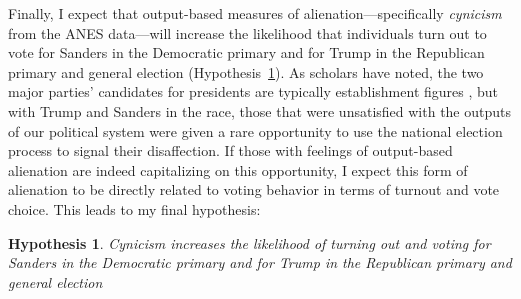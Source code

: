 \documentclass[12pt]{article}
\newtheorem{hyp}{Hypothesis}
\begin{document}
 

Finally, I expect that output-based measures of alienation---specifically \textit{cynicism} from the ANES data---will increase the likelihood that individuals turn out to vote for Sanders in the Democratic primary and for Trump in the Republican primary and general election (Hypothesis~\ref{hyp:output-voting}). As scholars have noted, the two major parties' candidates for presidents are typically establishment figures \parencite{templeton1966,cohen2009party}, but with Trump and Sanders in the race, those that were unsatisfied with the outputs of our political system were given a rare opportunity to use the national election process to signal their disaffection. If those with feelings of output-based alienation are indeed capitalizing on this opportunity, I expect this form of alienation to be directly related to voting behavior in terms of turnout and vote choice. This leads to my final hypothesis:

\begin{hyp}\label{hyp:output-voting}
Cynicism increases the likelihood of turning out and voting for Sanders in the Democratic primary and for Trump in the Republican primary and general election
\end{hyp}



\end{document}
